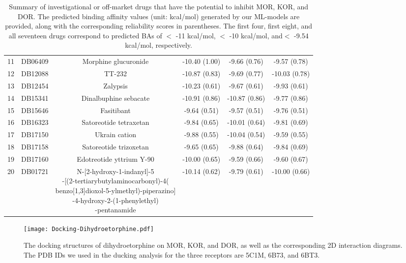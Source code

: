 \documentclass[10pt]{article}
\begin{document}
\begin{table}[ht]
\begin{tabular}{c| c c c c c}
				11&DB06409& Morphine glucuronide& -10.40 (1.00)& -9.66 (0.76)& -9.57 (0.78)\\
				12&DB12088& TT-232& -10.87 (0.83)& -9.69 (0.77)& -10.03 (0.78)\\
				13&DB12454& Zalypsis& -10.23 (0.61)& -9.67 (0.61)& -9.93 (0.61)\\
				14&DB15341& Dinalbuphine sebacate& -10.91 (0.86)& -10.87 (0.86)& -9.77 (0.86)\\
				15&DB15646& Fasitibant& -9.64 (0.51)& -9.57 (0.51)& -9.76 (0.51)\\
				16&DB16323& Satoreotide tetraxetan& -9.84 (0.65)& -10.01 (0.64)& -9.81 (0.69)\\
				17&DB17150& Ukrain cation& -9.88 (0.55)& -10.04 (0.54)& -9.59 (0.55)\\
				18&DB17158& Satoreotide trizoxetan& -9.65 (0.65)& -9.88 (0.64)& -9.84 (0.69)\\
				19&DB17160& Edotreotide yttrium Y-90& -10.00 (0.65)& -9.59 (0.66)& -9.60 (0.67)\\
				20&DB01721& \makecell[c]{ N-[2-hydroxy-1-indanyl]-5\\-[(2-tertiarybutylaminocarbonyl)-4(\\benzo[1,3]dioxol-5-ylmethyl)-piperazino]\\-4-hydroxy-2-(1-phenylethyl)\\-pentanamide}& -10.14 (0.62)& -9.79 (0.61)& -10.00 (0.66)\\
				\bottomrule
			\end{tabular}
			\caption{Summary of investigational or off-market drugs that have the potential to inhibit MOR, KOR, and DOR. The predicted binding affinity values (unit: kcal/mol) generated by our ML-models are provided, along with the corresponding reliability scores in parentheses. The first four, first eight, and all seventeen drugs correspond to predicted BAs of $<$ -11 kcal/mol, $<$ -10 kcal/mol, and$ <$ -9.54 kcal/mol, respectively.} 
			\label{tab:drugbank-investigational}
		\end{table}
		
		
		
		\begin{figure}[ht]
			\centering
			\texttt{[image: Docking-Dihydroetorphine.pdf]} 
			\caption{{\footnotesize The docking structures of dihydroetorphine on MOR, KOR, and DOR, as well as the corresponding 2D interaction diagrams. The PDB IDs we used in the ducking analysis for the three receptors are 5C1M, 6B73, and 6BT3.} }
			\label{Fig:Docking-Dihydroetorphine}
		\end{figure} 
		
\end{document}
